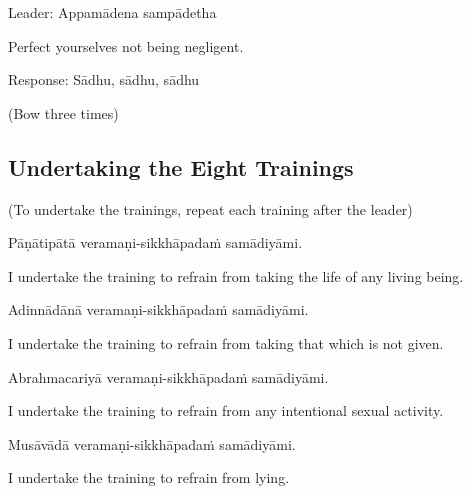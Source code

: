 Leader: Appamādena sampādetha\\

\begin{english}
  Perfect yourselves not being negligent.\\
\end{english}

Response: Sādhu, sādhu, sādhu\\

\begin{center}
  (Bow three times)\\
\end{center}

\subsection*{Undertaking the Eight Trainings}

\begin{center}
  (To undertake the trainings, repeat each training after the leader)\\
\end{center}

Pāṇātipātā veramaṇi-sikkhāpadaṁ samādiyāmi.\\

\begin{english}
  I undertake the training to refrain from taking the life of any living being.\\
\end{english}

Adinnādānā veramaṇi-sikkhāpadaṁ samādiyāmi.\\

\begin{english}
  I undertake the training to refrain from taking that which is not given.\\
\end{english}

Abrahmacariyā veramaṇi-sikkhāpadaṁ samādiyāmi.\\

\begin{english}
  I undertake the training to refrain from any intentional sexual activity.\\
\end{english}

Musāvādā veramaṇi-sikkhāpadaṁ samādiyāmi.\\

\begin{english}
  I undertake the training to refrain from lying.\\
\end{english}

